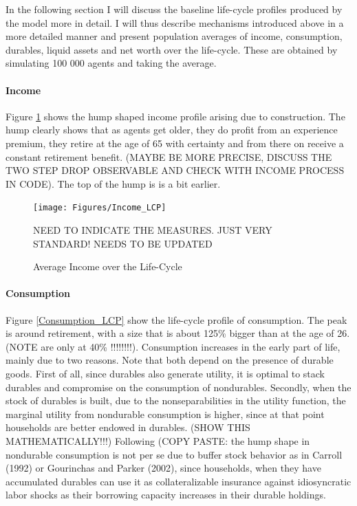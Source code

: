 \documentclass[a4paper,12pt]{article}
\begin{document}
In the following section I will discuss the baseline life-cycle profiles produced by the model more in detail. I will thus describe mechanisms introduced above in a more detailed manner and present population averages of income, consumption, durables, liquid assets and net worth over the life-cycle. These are obtained by simulating 100 000 agents and taking the average. 

\paragraph{Income}

Figure \ref{Income_LCP} shows the hump shaped income profile arising due to construction. The hump clearly shows that as agents get older, they do profit from an experience premium, they retire at the age of 65 with certainty and from there on receive a constant retirement benefit. (MAYBE BE MORE PRECISE, DISCUSS THE TWO STEP DROP OBSERVABLE AND CHECK WITH INCOME PROCESS IN CODE). The top of the hump is is a bit earlier.

\begin{figure}[!htbp]
\caption{Average Income over the Life-Cycle} 
\label{Income_LCP}	%
\centering
\texttt{[image: Figures/Income\_LCP]}  %

\begin{minipage}{0.8\linewidth}
\footnotesize{NEED TO INDICATE THE MEASURES. JUST VERY STANDARD! NEEDS TO BE UPDATED}
\end{minipage}

\end{figure}

\paragraph{Consumption}

Figure \ref{Consumption_LCP} show the life-cycle profile of consumption. The peak is around retirement, with a size that is about 125\% bigger than at the age of 26. (NOTE \cite{FV&K2011} are only at 40\% !!!!!!!!). Consumption increases in the early part of life, mainly due to two reasons. Note that both depend on the presence of durable goods. First of all, since durables also generate utility, it is optimal to stack durables and compromise on the consumption of nondurables. Secondly, when the stock of durables is built, due to the nonseparabilities in the utility function, the marginal utility from nondurable consumption is higher, since at that point households are better endowed in durables. (SHOW THIS MATHEMATICALLY!!!)
Following \cite{FV&K2011} (COPY PASTE: the hump shape in nondurable consumption is not per se due to buffer stock behavior as in Carroll (1992) or Gourinchas and Parker (2002), since households, when they have accumulated durables can use it as collateralizable insurance against idiosyncratic labor shocks as their borrowing capacity increases in their durable holdings.
\end{document}
